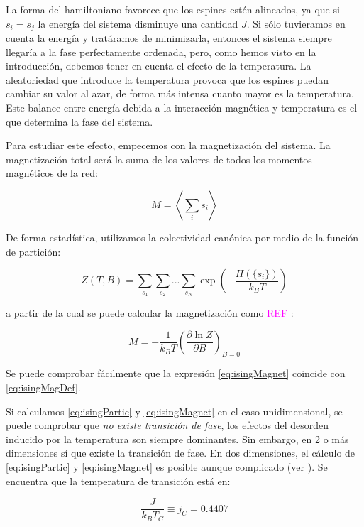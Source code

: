 \documentclass[11pt, a4paper]{article} %
\theoremstyle{named}
\begin{document}
La forma del hamiltoniano favorece que los espines estén alineados, ya que si $s_i = s_j$ la energía del sistema disminuye una cantidad $J$. Si sólo tuvieramos en cuenta la energía y tratáramos de minimizarla, entonces el sistema siempre llegaría a la fase perfectamente ordenada, pero, como hemos visto en la introducción, debemos tener en cuenta el efecto de la temperatura. La aleatoriedad que introduce la temperatura provoca que los espines puedan cambiar su valor al azar, de forma más intensa cuanto mayor es la temperatura. Este balance entre energía debida a la interacción magnética y temperatura es el que determina la fase del sistema.

Para estudiar este efecto, empecemos con la magnetización del sistema. La magnetización total será la suma de los valores de todos los momentos magnéticos de la red:

\begin{equation}\label{eq:isingMagDef}
    M = \left \langle \sum_i s_i \right \rangle
\end{equation}

De forma estadística, utilizamos la colectividad canónica por medio de la función de partición:

\begin{equation}\label{eq:isingPartic}
    Z(T,B) = \sum_{s_1} \sum_{s_2}...\sum_{s_N} \exp \left( -\frac{H(\{s_i\})}{k_B T} \right)
\end{equation}

a partir de la cual se puede calcular la magnetización como \textcolor{magenta}{REF} \cite{}:

\begin{equation}\label{eq:isingMagnet}
    M = - \frac{1}{k_B T} \left( \frac{\partial \ln Z}{\partial B} \right)_ {B=0}
\end{equation}

Se puede comprobar fácilmente que la expresión \eqref{eq:isingMagnet} coincide con \eqref{eq:isingMagDef}.

Si calculamos \eqref{eq:isingPartic} y \eqref{eq:isingMagnet} en el caso unidimensional, se puede comprobar que \textit{no existe transición de fase}, los efectos del desorden inducido por la temperatura son siempre dominantes. Sin embargo, en 2 o más dimensiones sí que existe la transición de fase. En dos dimensiones, el cálculo de \eqref{eq:isingPartic} y \eqref{eq:isingMagnet} es posible aunque complicado (ver \cite{huang}). Se encuentra que la temperatura de transición está en:

$$
\frac{J}{k_B T_C} \equiv j_C = 0.4407
$$
\end{document}
